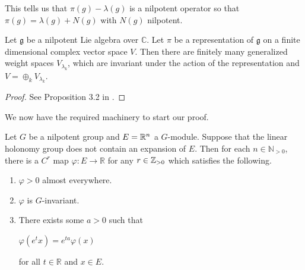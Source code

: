\begin{remark}
    This tells us that $\pi(g) - \lambda(g)$ is a nilpotent operator so that $\pi(g) = \lambda(g) + N(g)$ with $N(g)$ nilpotent.
\end{remark}

\begin{lemma}
    \label{lemma:lie-algebra-decomp}
    Let $\mathfrak{g}$ be a nilpotent Lie algebra over $\mathbb{C}$. Let $\pi$ be a representation of
    $\mathfrak{g}$ on a finite dimensional complex vector space $V$. Then there are finitely many generalized
    weight spaces $ V_{\lambda_k}$, which are invariant under the action of the representation and $V = \oplus_k V_{\lambda_k}$.
\end{lemma}

\begin{proof}
    See Proposition 3.2 in \cite{ward2013semisimple}.
\end{proof}

We now have the required machinery to start our proof.

\begin{lemma}\label{lemma:exists-map}
    Let $G$ be a nilpotent group and $E=\mathbb{R}^n$ a $G$-module. Suppose that the linear holonomy group does not
    contain an expansion of $E$. Then for each $n \in \mathbb{N}_{>0}$, there is a $C^r$ map $\varphi : E \to \mathbb{R}$ for any $r \in \mathbb{Z}_{>0}$
    which satisfies the following.
    \begin{enumerate}
        \item $\varphi > 0$ almost everywhere.
        \item $\varphi$ is $G$-invariant.
        \item There exists some $a>0$ such that
              \begin{center}
                  $\varphi(e^{t}x) = e^{ta}\varphi(x)$
              \end{center}
              for all $t \in \mathbb{R}$ and $x \in E$.
    \end{enumerate}
\end{lemma}

